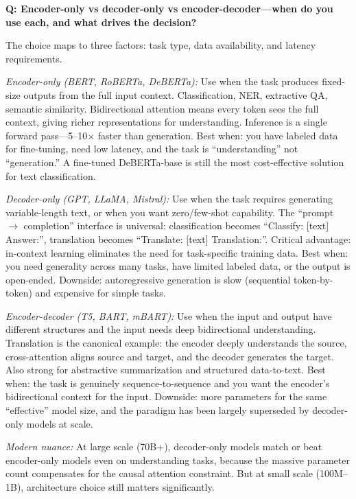 \begin{interviewq}
\textbf{Q: Encoder-only vs decoder-only vs encoder-decoder---when do you use each, and what drives the decision?}

 \quad {} \quad \badgefreq{\freqhigh}

\stronganswer The choice maps to three factors: task type, data availability, and latency requirements.

\textit{Encoder-only (BERT, RoBERTa, DeBERTa):} Use when the task produces fixed-size outputs from the full input context. Classification, NER, extractive QA, semantic similarity. Bidirectional attention means every token sees the full context, giving richer representations for understanding. Inference is a single forward pass---5--10$\times$ faster than generation. Best when: you have labeled data for fine-tuning, need low latency, and the task is ``understanding'' not ``generation.'' A fine-tuned DeBERTa-base is still the most cost-effective solution for text classification.

\textit{Decoder-only (GPT, LLaMA, Mistral):} Use when the task requires generating variable-length text, or when you want zero/few-shot capability. The ``prompt $\to$ completion'' interface is universal: classification becomes ``Classify: [text] Answer:'', translation becomes ``Translate: [text] Translation:''. Critical advantage: in-context learning eliminates the need for task-specific training data. Best when: you need generality across many tasks, have limited labeled data, or the output is open-ended. Downside: autoregressive generation is slow (sequential token-by-token) and expensive for simple tasks.

\textit{Encoder-decoder (T5, BART, mBART):} Use when the input and output have different structures and the input needs deep bidirectional understanding. Translation is the canonical example: the encoder deeply understands the source, cross-attention aligns source and target, and the decoder generates the target. Also strong for abstractive summarization and structured data-to-text. Best when: the task is genuinely sequence-to-sequence and you want the encoder's bidirectional context for the input. Downside: more parameters for the same ``effective'' model size, and the paradigm has been largely superseded by decoder-only models at scale.

\textit{Modern nuance:} At large scale (70B+), decoder-only models match or beat encoder-only models even on understanding tasks, because the massive parameter count compensates for the causal attention constraint. But at small scale (100M--1B), architecture choice still matters significantly.


\end{interviewq}

